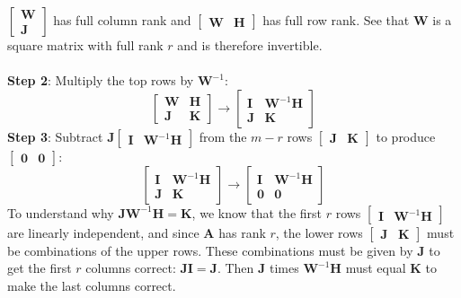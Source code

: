 \documentclass{report}
\begin{document}
$\left[\begin{array}{c}\bm W\\\bm J\end{array}\right]$ has full column rank and 
$\left[\begin{array}{cc}\bm W&\bm H\end{array}\right]$ has full row rank. See that $\bm W$ is a square matrix with full rank $r$ and is therefore invertible.\\
\vspace{1mm}\\
\textbf{Step 2}: Multiply the top rows by $\bm W^{-1}$:
\begin{equation*}
\left[\begin{array}{cc}
\bm W&\bm H\\
\bm J&\bm K\end{array}\right]\to
\left[\begin{array}{cc}
\bm I&\bm W^{-1}\bm H\\
\bm J&\bm K\end{array}\right]
\end{equation*}
\textbf{Step 3}: Subtract $\bm J[\begin{array}{cc}\bm I&\bm W^{-1}\bm H\end{array}]$
from the $m-r$ rows $[\begin{array}{cc}\bm J&\bm K\end{array}]$ to produce
$[\begin{array}{cc}\bm0&\bm0\end{array}]$:
\begin{equation*}
\left[\begin{array}{cc}
\bm I&\bm W^{-1}\bm H\\
\bm J&\bm K\end{array}\right]\to
\left[\begin{array}{cc}
\bm I&\bm W^{-1}\bm H\\
\bm 0&\bm 0\end{array}\right]
\end{equation*}
To understand why $\bm J\bm W^{-1}\bm H=\bm K$, we know that the first $r$ rows 
$[\begin{array}{cc}\bm I&\bm W^{-1}\bm H\end{array}]$ are linearly independent, and since $\bm A$ has rank $r$, the lower rows $[\begin{array}{cc}\bm J&\bm K\end{array}]$ 
must be combinations of the upper rows. These combinations must be given by $\bm J$ to get
the first $r$ columns correct: $\bm{JI}=\bm J$. Then $\bm J$ times $\bm W^{-1}\bm H$ must equal $\bm K$ to make the last columns correct.\\
\end{document}
